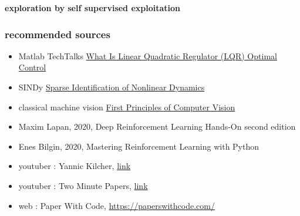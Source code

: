 \documentclass{beamer}
\begin{document}
\begin{frame}{\bf exploration by self supervised exploitation}


\end{frame}



\begin{frame}
  
  \frametitle{\bf recommended sources}

  \begin{itemize}

    \item Matlab TechTalks \href{https://www.youtube.com/watch?v=E_RDCFOlJx4}{What Is Linear Quadratic Regulator (LQR) Optimal Control}
    \item SINDy \href{https://www.youtube.com/watch?v=NxAn0oglMVw}{Sparse Identification of Nonlinear Dynamics}
    \item classical machine vision \href{https://www.youtube.com/@firstprinciplesofcomputerv3258/videos}{First Principles of Computer Vision}
    \item Maxim Lapan, 2020, Deep Reinforcement Learning Hands-On second edition
    \item Enes Bilgin, 2020, Mastering Reinforcement Learning with Python
    \item youtuber : Yannic Kilcher, \href{https://www.youtube.com/c/YannicKilcher/videos}{link}
    \item youtuber : Two Minute Papers, \href{https://www.youtube.com/c/KárolyZsolnai/videos}{link}
    \item web : Paper With Code, \href{https://paperswithcode.com/methods/category/policy-gradient-methods}{https://paperswithcode.com/}
  \end{itemize}

 
    
\end{frame}
\end{document}
